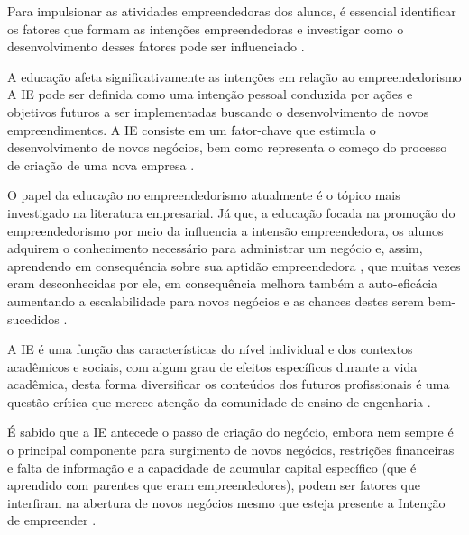 Para impulsionar as atividades empreendedoras dos alunos, é essencial identificar os fatores que formam as intenções empreendedoras e investigar como o desenvolvimento desses fatores pode ser influenciado \cite{gubik_entrepreneurial_2019}. 

A educação afeta significativamente as intenções em relação ao empreendedorismo
A IE pode ser definida como uma intenção pessoal conduzida por ações e objetivos futuros a ser implementadas buscando o desenvolvimento de novos empreendimentos. A IE consiste em um fator-chave que estimula o desenvolvimento de novos negócios, bem como representa o começo do processo de criação de uma nova empresa \cite{vasconcelos_intencao_2020}.


O papel da educação no empreendedorismo atualmente é o tópico mais  investigado na literatura empresarial. Já que, a educação focada na promoção do empreendedorismo por meio da influencia a intensão empreendedora, os alunos adquirem o conhecimento necessário para administrar um negócio e, assim, aprendendo em consequência sobre sua aptidão empreendedora \cite{nowinski_impact_2019}, que muitas vezes eram desconhecidas por ele, em consequência melhora também a auto-eficácia \cite{egerova_does_2017} aumentando a escalabilidade para novos negócios e as chances destes serem bem-sucedidos \cite{kolstad_education_2015}.

A IE é uma função das características do nível individual e dos contextos acadêmicos e sociais, com algum grau de efeitos específicos durante a vida acadêmica, desta forma diversificar os conteúdos dos futuros profissionais é uma questão crítica que merece atenção da comunidade de ensino de engenharia \cite{gilmartin_entrepreneurial_2019}.

É sabido que a IE antecede o passo de criação do negócio, embora nem sempre é o principal componente para surgimento de novos negócios, restrições financeiras e falta de informação e a capacidade de acumular capital específico (que é aprendido com parentes que eram empreendedores), podem ser fatores que interfiram na abertura de novos negócios mesmo que esteja presente a Intenção de empreender \cite{auguste_what_2016}.



